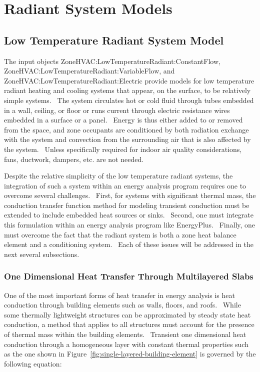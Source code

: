 \section{Radiant System Models }\label{radiant-system-models}

\subsection{Low Temperature Radiant System Model}\label{low-temperature-radiant-system-model}

The input objects ZoneHVAC:LowTemperatureRadiant:ConstantFlow, ZoneHVAC:LowTemperatureRadiant:VariableFlow, and ZoneHVAC:LowTemperatureRadiant:Electric provide models for low temperature radiant heating and cooling systems that appear, on the surface, to be relatively simple systems.~ The system circulates hot or cold fluid through tubes embedded in a wall, ceiling, or floor or runs current through electric resistance wires embedded in a surface or a panel.~ Energy is thus either added to or removed from the space, and zone occupants are conditioned by both radiation exchange with the system and convection from the surrounding air that is also affected by the system.~ Unless specifically required for indoor air quality considerations, fans, ductwork, dampers, etc. are not needed.

Despite the relative simplicity of the low temperature radiant systems, the integration of such a system within an energy analysis program requires one to overcome several challenges.~ First, for systems with significant thermal mass, the conduction transfer function method for modeling transient conduction must be extended to include embedded heat sources or sinks.~ Second, one must integrate this formulation within an energy analysis program like EnergyPlus.~ Finally, one must overcome the fact that the radiant system is both a zone heat balance element and a conditioning system.~ Each of these issues will be addressed in the next several subsections.

\subsubsection{One Dimensional Heat Transfer Through Multilayered Slabs}\label{one-dimensional-heat-transfer-through-multilayered-slabs}

One of the most important forms of heat transfer in energy analysis is heat conduction through building elements such as walls, floors, and roofs.~ While some thermally lightweight structures can be approximated by steady state heat conduction, a method that applies to all structures must account for the presence of thermal mass within the building elements.~ Transient one dimensional heat conduction through a homogeneous layer with constant thermal properties such as the one shown in Figure~\ref{fig:single-layered-building-element} is governed by the following equation:

